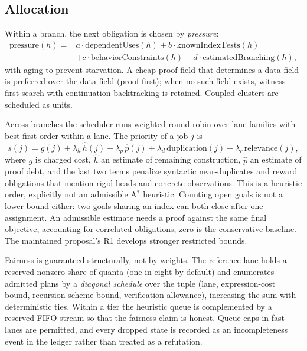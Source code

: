 \subsection{Allocation}

Within a branch, the next obligation is chosen by \emph{pressure}:
\[
\begin{aligned}
\mathrm{pressure}(h) = {}& a\cdot\mathrm{dependentUses}(h) + b\cdot\mathrm{knownIndexTests}(h) \\
& + c\cdot\mathrm{behaviorConstraints}(h) - d\cdot\mathrm{estimatedBranching}(h),
\end{aligned}
\]
with aging to prevent starvation. A cheap proof field that determines a data field is preferred over the data field (proof-first); when no such field exists, witness-first search with continuation backtracking is retained. Coupled clusters are scheduled as units.

Across branches the scheduler runs weighted round-robin over lane families with best-first order within a lane. The priority of a job $j$ is
\[
s(j) = g(j) + \lambda_h\,\hat h(j) + \lambda_p\,\hat p(j) + \lambda_d\,\mathrm{duplication}(j) - \lambda_r\,\mathrm{relevance}(j),
\]
where $g$ is charged cost, $\hat h$ an estimate of remaining construction, $\hat p$ an estimate of proof debt, and the last two terms penalize syntactic near-duplicates and reward obligations that mention rigid heads and concrete observations. This is a heuristic order, explicitly not an admissible A$^*$ heuristic. Counting open goals is not a lower bound either: two goals sharing an index can both close after one assignment. An admissible estimate needs a proof against the same final objective, accounting for correlated obligations; zero is the conservative baseline. The maintained proposal's R1 develops stronger restricted bounds.

Fairness is guaranteed structurally, not by weights. The reference lane holds a reserved nonzero share of quanta (one in eight by default) and enumerates admitted plans by a \emph{diagonal schedule} over the tuple (lane, expression-cost bound, recursion-scheme bound, verification allowance), increasing the sum with deterministic ties. Within a tier the heuristic queue is complemented by a reserved FIFO stream so that the fairness claim is honest. Queue caps in fast lanes are permitted, and every dropped state is recorded as an incompleteness event in the ledger rather than treated as a refutation.

